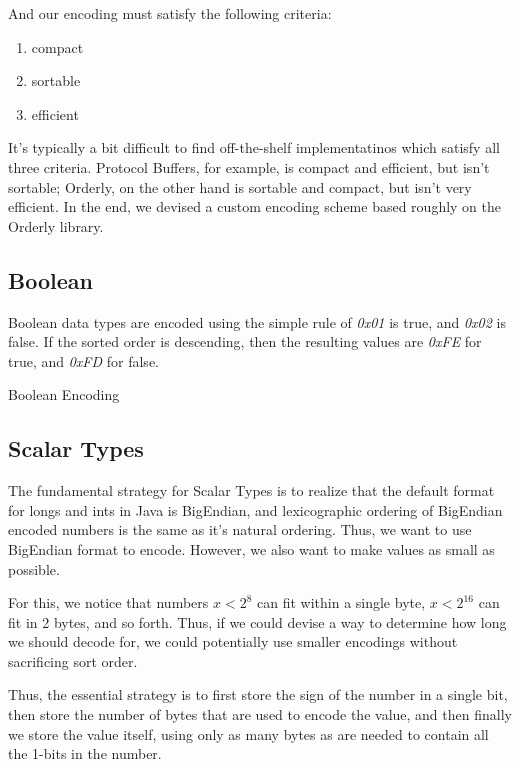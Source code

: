 And our encoding must satisfy the following criteria:

\begin{enumerate}
\item compact
\item sortable
\item efficient
\end{enumerate}

It's typically a bit difficult to find off-the-shelf implementatinos which satisfy all three criteria. Protocol Buffers, for example, is compact and efficient, but isn't sortable; Orderly, on the other hand is sortable and compact, but isn't very efficient. In the end, we devised a custom encoding scheme based roughly on the Orderly library.

\subsection{Boolean}
Boolean data types are encoded using the simple rule of \emph{0x01} is true, and \emph{0x02} is false. If the sorted order is descending, then the resulting values are \emph{0xFE} for true, and \emph{0xFD} for false. 

\begin{algorithm}
\caption{Boolean Encoding}
\end{algorithm}

\subsection{Scalar Types}
The fundamental strategy for Scalar Types is to realize that the default format for longs and ints in Java is BigEndian, and lexicographic ordering of BigEndian encoded numbers is the same as it's natural ordering. Thus, we want to use BigEndian format to encode. However, we also want to make values as small as possible. 

For this, we notice that numbers $x < 2^8$ can fit within a single byte, $x<2^16$ can fit in 2 bytes, and so forth. Thus, if we could devise a way to determine how long we should decode for, we could potentially use smaller encodings without sacrificing sort order. 

Thus, the essential strategy is to first store the sign of the number in a single bit, then store the number of bytes that are used to encode the value, and then finally we store the value itself, using only as many bytes as are needed to contain all the 1-bits in the number.

